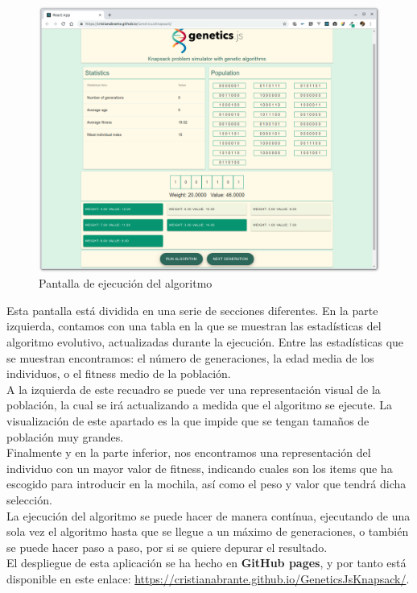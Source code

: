 \begin{figure}[H]
    \centering
    \includegraphics[scale=0.2]{mem/images/cap-5/knapsack-2.png}
    \caption{Pantalla de ejecución del algoritmo}
    \label{fig:screenshot-1}
\end{figure}

Esta pantalla está dividida en una serie de secciones diferentes. En la parte izquierda, contamos con una tabla en la que se muestran las estadísticas del algoritmo evolutivo, actualizadas durante la ejecución. Entre las estadísticas que se muestran encontramos: el número de generaciones, la edad media de los individuos, o el fitness medio de la población. \\

A la izquierda de este recuadro se puede ver una representación visual de la población, la cual se irá actualizando a medida que el algoritmo se ejecute. La visualización de este apartado es la que impide que se tengan tamaños de población muy grandes. \\

Finalmente y en la parte inferior, nos encontramos una representación del individuo con un mayor valor de fitness, indicando cuales son los items que ha escogido para introducir en la mochila, así como el peso y valor que tendrá dicha selección. \\

La ejecución del algoritmo se puede hacer de manera contínua, ejecutando de una sola vez el algoritmo hasta que se llegue a un máximo de generaciones, o también se puede hacer paso a paso, por si se quiere depurar el resultado. \\

El despliegue de esta aplicación se ha hecho en \textbf{GitHub pages}, y por tanto está disponible en este enlace: \url{https://cristianabrante.github.io/GeneticsJsKnapsack/}.
